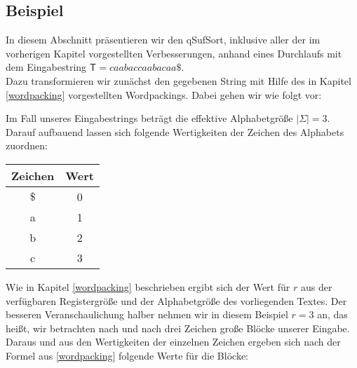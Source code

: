 \usetikzlibrary{decorations.pathreplacing,calc}

\newcommand{\tikzmark}[2][-3pt]{\tikz[remember picture, overlay, baseline=-0.5ex]\node[#1](#2){};}

\setcounter{arrow}{0}
\newcommand{\drawcurvedarrow}[3][]{%
 \refstepcounter{arrow}
 \tikz[remember picture, overlay]\draw (#2.center)edge[#1]node[coordinate,pos=0.5, name=arrow-\thearrow]{}(#3.center);
}

\newcommand{\annote}[3][]{%
 \tikz[remember picture, overlay]\node[#1] at (#2) {#3};
}

\subsection{Beispiel}
In diesem Abschnitt präsentieren wir den qSufSort, inklusive aller der im vorherigen Kapitel vorgestellten Verbesserungen, anhand eines Durchlaufs mit dem Eingabestring $\mathsf{T} = caabaccaabacaa\$$.\\
Dazu transformieren wir zunächst den gegebenen String mit Hilfe des in Kapitel \ref{wordpacking} vorgestellten Wordpackings. Dabei gehen wir wie folgt vor: 

Im Fall unseres Eingabestrings beträgt die effektive Alphabetgröße $|\Sigma| = 3$. Darauf aufbauend lassen sich folgende Wertigkeiten der Zeichen des Alphabets zuordnen:

\begin{center}

\begin{tabular}{c | c}
Zeichen & Wert \\
\hline
$\$$ & 0 \\
a & 1 \\
b & 2 \\
c & 3 
\end{tabular}
\end{center}

Wie in Kapitel \ref{wordpacking} beschrieben ergibt sich der Wert für $r$ aus der verfügbaren Registergröße und der Alphabetgröße des vorliegenden Textes. Der besseren Veranschaulichung halber nehmen wir in diesem Beispiel $r=3$ an, das heißt, wir betrachten nach und nach drei Zeichen große Blöcke unserer Eingabe. Daraus und aus den Wertigkeiten der einzelnen Zeichen ergeben sich nach der Formel aus \ref{wordpacking} folgende Werte für die Blöcke: 


